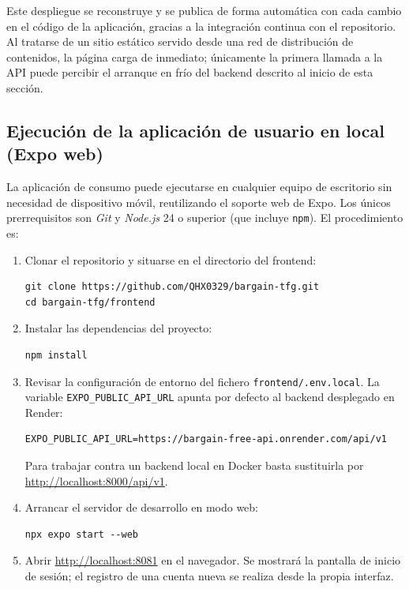 Este despliegue se reconstruye y se publica de forma autom\'atica con cada cambio en el c\'odigo
de la aplicaci\'on, gracias a la integraci\'on continua con el repositorio. Al tratarse de un
sitio est\'atico servido desde una red de distribuci\'on de contenidos, la p\'agina carga de
inmediato; \'unicamente la primera llamada a la API puede percibir el arranque en fr\'io del
backend descrito al inicio de esta secci\'on.

\subsection{Ejecuci\'on de la aplicaci\'on de usuario en local (Expo web)}\label{subsec:manual-expo-local}

La aplicaci\'on de consumo puede ejecutarse en cualquier equipo de escritorio sin necesidad de
dispositivo m\'ovil, reutilizando el soporte web de Expo. Los \'unicos prerrequisitos son
\emph{Git} y \emph{Node.js} 24 o superior (que incluye \texttt{npm}). El procedimiento es:

\begin{enumerate}
  \item Clonar el repositorio y situarse en el directorio del frontend:
\begin{verbatim}
git clone https://github.com/QHX0329/bargain-tfg.git
cd bargain-tfg/frontend
\end{verbatim}
  \item Instalar las dependencias del proyecto:
\begin{verbatim}
npm install
\end{verbatim}
  \item Revisar la configuraci\'on de entorno del fichero \texttt{frontend/.env.local}. La
    variable \texttt{EXPO\_PUBLIC\_API\_URL} apunta por defecto al backend desplegado en
    Render:
{\footnotesize
\begin{verbatim}
EXPO_PUBLIC_API_URL=https://bargain-free-api.onrender.com/api/v1
\end{verbatim}
}
    Para trabajar contra un backend local en Docker basta sustituirla por
    \url{http://localhost:8000/api/v1}.
  \item Arrancar el servidor de desarrollo en modo web:
\begin{verbatim}
npx expo start --web
\end{verbatim}
  \item Abrir \url{http://localhost:8081} en el navegador. Se mostrar\'a la pantalla de
    inicio de sesi\'on; el registro de una cuenta nueva se realiza desde la propia interfaz.
\end{enumerate}

